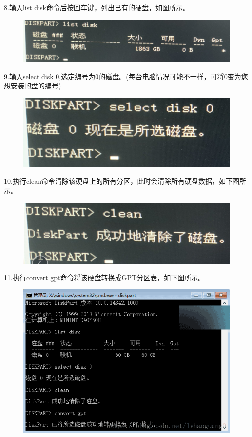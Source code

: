 \documentclass[openbib]{article}
\begin{document}
8.输入list disk命令后按回车键，列出已有的硬盘，如图所示。
\begin{figure}[H]
	\centering
	\includegraphics[scale=0.3]{9}
\end{figure}

9.输入select disk 0,选定编号为0的磁盘。(每台电脑情况可能不一样，可将0变为您想安装的盘的编号)
\begin{figure}[htbp]
	\centering
	\includegraphics[scale=0.3]{10}
\end{figure}

10.执行clean命令清除该硬盘上的所有分区，此时会清除所有硬盘数据，如下图所示。
\begin{figure}[H]
	\centering
	\includegraphics[scale=0.3]{11}
\end{figure}

11.执行convert gpt命令将该硬盘转换成GPT分区表，如下图所示。
\begin{figure}[htbp]
	\centering
	\includegraphics[scale=0.3]{12}
\end{figure}
\end{document}

